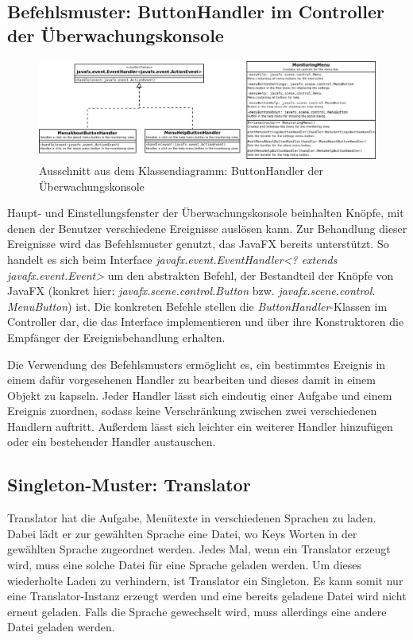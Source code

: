 \documentclass[parskip=full]{scrartcl}
\begin{document}
\pagebreak
\subsection{Befehlsmuster: ButtonHandler im Controller der Überwachungskonsole}
\begin{figure}[H]
  \centering
  \includegraphics[scale=0.33]{design/pattern-screenshots/command-ButtonHandler.png}
  \caption{Ausschnitt aus dem Klassendiagramm: ButtonHandler der Überwachungskonsole}
\end{figure}
Haupt- und Einstellungsfenster der Überwachungskonsole beinhalten Knöpfe, mit denen der Benutzer verschiedene
Ereignisse auslösen kann. Zur Behandlung dieser Ereignisse wird das Befehlsmuster genutzt, das JavaFX bereits
unterstützt. So handelt es sich beim Interface \emph{javafx.event.EventHandler<? extends javafx.event.Event>}
um den abstrakten Befehl, der Bestandteil der Knöpfe von JavaFX (konkret hier: \emph{javafx.scene.control.Button} bzw. 
\emph{javafx.scene.control.\\MenuButton}) ist. Die konkreten Befehle stellen die \emph{ButtonHandler}-Klassen
im Controller dar, die das Interface implementieren und über ihre Konstruktoren die Empfänger der
Ereignisbehandlung erhalten.

Die Verwendung des Befehlsmusters ermöglicht es, ein bestimmtes Ereignis in einem dafür vorgesehenen Handler
zu bearbeiten und dieses damit in einem Objekt zu kapseln. Jeder Handler lässt sich eindeutig einer Aufgabe
und einem Ereignis zuordnen, sodass keine Verschränkung zwischen zwei verschiedenen Handlern auftritt.
Außerdem lässt sich leichter ein weiterer Handler hinzufügen oder ein bestehender Handler austauschen.

\pagebreak
\subsection{Singleton-Muster: Translator}
Translator hat die Aufgabe, Menütexte in verschiedenen Sprachen zu laden.
Dabei lädt er zur gewählten Sprache eine Datei, wo Keys Worten in der gewählten Sprache
zugeordnet werden. Jedes Mal, wenn ein Translator erzeugt wird, muss eine solche Datei
für eine Sprache geladen werden. Um dieses wiederholte Laden zu verhindern, ist Translator ein Singleton.
Es kann somit nur eine Translator-Instanz erzeugt werden und eine bereits geladene Datei
wird nicht erneut geladen. Falls die Sprache gewechselt wird, muss allerdings eine andere Datei geladen werden.
\end{document}
